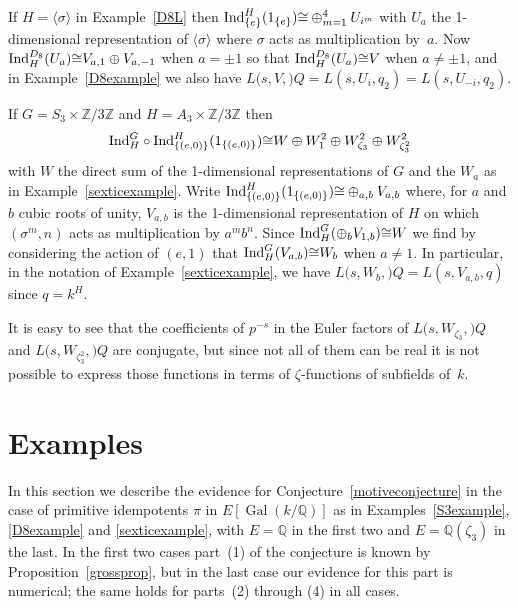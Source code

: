 \documentclass{amsart}
\begin{document}
\begin{remark}
If $ H=\langle{\sigma}\rangle $ in Example~\ref{D8L}
then $ {\textup{Ind}_{\{e\}}^{H}}(1_{\{e\}}) {\cong} \oplus_{m=1}^4 U_{i^m} $ with
$ U_a $ the 1-dimensional representation of $ \langle{\sigma}\rangle $ where $ {\sigma} $ acts as multiplication
by~$ a $.  Now $ {\textup{Ind}_{H}^{D_8}}(U_a) {\cong} {V_{a,1}}\oplus {V_{a,-1}} $ when $ a = \pm 1 $
so that $ {\textup{Ind}_{H}^{D_8}}(U_a) {\cong} V $ when $ a \ne \pm 1 $, and 
in Example~\ref{D8example} we also have $ {L(s,V,{\mathbb)}Q}  = {L(s,U_i,q_2)}= {L(s,U_{-i},q_2)}$.
\end{remark}

\begin{example}\label{sexticL}
If $ G = S_3 \times {\mathbb Z}/3{\mathbb Z} $ and $ H = A_3 \times {\mathbb Z}/3{\mathbb Z} $ then
$$
{\textup{Ind}_{H}^{G}}\circ {\textup{Ind}_{{\{(e,0)\}}}^{H}}(1_{\{(e,0)\}})
{\cong} W \oplus W_1^2 \oplus W_{{\zeta}_3}^2 \oplus W_{{\zeta}_3^2}^2 
$$
with $ W $ the direct sum of the 1-dimensional representations of $ G $
and the $ W_a $ as in Example~\ref{sexticexample}.
Write $  {\textup{Ind}_{{\{(e,0)\}}}^{H}}(1_{\{(e,0)\}}) {\cong} \oplus_{a,b} V_{a,b} $ where,
for $ a $ and $ b $ cubic roots of unity, $ V_{a,b} $ is the 1-dimensional representation of $ H $
on which $ ({\sigma}^m,n) $ acts as multiplication by $ a^m b^n $.
Since $ {\textup{Ind}_{H}^{G}}(\oplus_b V_{1,b}) {\cong} W $ we find by considering the action of $ (e,1) $
that $ {\textup{Ind}_{H}^{G}}(V_{a,b}) {\cong} W_b $  when $ a \ne 1 $.  In particular, in the notation of Example~\ref{sexticexample},
we have $ {L(s,W_b,{\mathbb)}Q} = {L(s,V_{a,b},q)}$ since $ q = k^H $.

It is easy to see that the coefficients of $ p^{-s} $ in the Euler factors of
$ {L(s,W_{{\zeta}_3},{\mathbb)}Q} $ and $ {L(s,W_{{\zeta}_3^2},{\mathbb)}Q} $ are conjugate, but since not all of them can be real
it is not possible to express those functions in terms of $ {\zeta} $-functions of subfields of~$ k $.
\end{example}

\section{Examples}\label{examplesection}

In this section we describe the evidence for Conjecture~\ref{motiveconjecture} in the case of 
primitive idempotents $ \pi $ in $ E[{\operatorname{Gal}}(k/{\mathbb Q})] $ as in Examples~\ref{S3example}, \ref{D8example} and \ref{sexticexample},
with $ E={\mathbb Q} $ in the first two and $ E={\mathbb Q}({\zeta}_3) $ in the last.
In the first two cases part~(1) of the conjecture is known by Proposition~\ref{grossprop},
but in the last case our evidence for this part is numerical; the same holds for parts~(2) through (4) in all cases.
\end{document}
